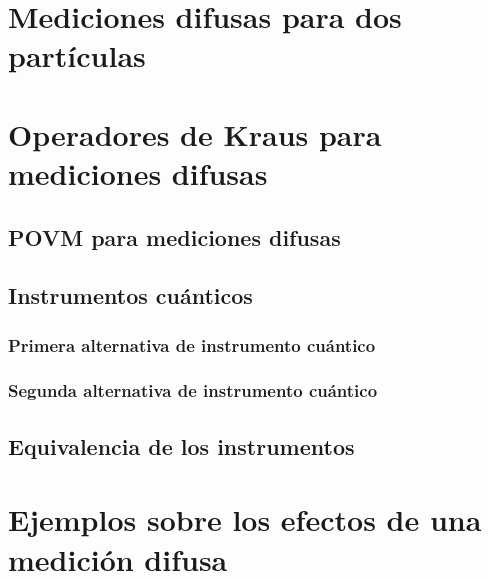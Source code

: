\section{Mediciones difusas para dos partículas} %




\section{Operadores de Kraus para mediciones difusas} %




\subsection{POVM para mediciones difusas}\label{Sec_POVM_para_mediciones_difusas} %




\subsection{Instrumentos cuánticos}\label{sec:instrumentos-cuanticos} %




\subsubsection{Primera alternativa de instrumento cuántico} %

\subsubsection{Segunda alternativa de instrumento cuántico}

\subsection{Equivalencia de los instrumentos}


\section{Ejemplos sobre los efectos de una medición difusa} %
